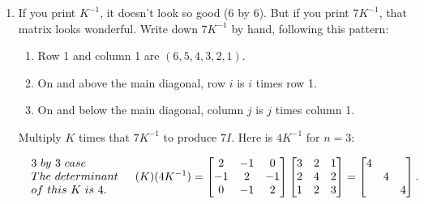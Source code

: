 \documentclass[14pt, a4paper]{article}
\begin{document}
\begin{enumerate}[resume]
    \item If you print $K^{-1}$, it doesn't look so good (6 by 6). But if you print $7K^{-1}$, that matrix looks wonderful. Write down $7K^{-1}$ by hand, following this pattern:
          \begin{enumerate}
              \item[1] Row 1 and column 1 are $(6,5,4,3,2,1)$.
              \item[2] On and above the main diagonal, row $i$ is $i$ times row 1.
              \item[3] On and below the main diagonal, column $j$ is $j$ times column 1.
          \end{enumerate}
          Multiply $K$ times that $7K^{-1}$ to produce $7I$. Here is $4K^{-1}$ for $n=3$:

          \[
              \begin{array}{l@{\quad}c}  %
                  \begin{array}{l}  %
                      3\ by\ 3 \ case  \\
                      The\ determinant \\
                      of\ this\ K\ is\ 4.
                  \end{array}
                   &
                  \begin{aligned}
                      (K)(4K^{-1}) =
                      \begin{bmatrix}
                          2  & -1 & 0  \\
                          -1 & 2  & -1 \\
                          0  & -1 & 2
                      \end{bmatrix}
                      \begin{bmatrix}
                          3 & 2 & 1 \\
                          2 & 4 & 2 \\
                          1 & 2 & 3
                      \end{bmatrix}
                      =
                      \begin{bmatrix}
                          4 &   &   \\
                            & 4 &   \\
                            &   & 4
                      \end{bmatrix}.
                  \end{aligned}
              \end{array}
          \]

\end{enumerate}
\end{document}
